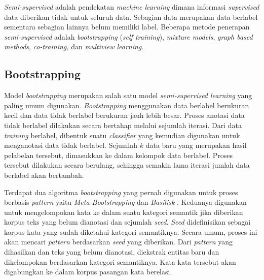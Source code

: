 \textit{Semi-supervised} adalah pendekatan \textit{machine learning} dimana informasi \textit{supervised} data diberikan tidak untuk seluruh data. Sebagian data merupakan data berlabel sementara sebagian lainnya belum memiliki label. Beberapa metode penerapan \textit{semi-supervised} adalah \textit{bootstrapping} (\textit{self training}), \textit{mixture models}, \textit{graph based methods}, \textit{co-training,} dan \textit{multiview learning}.

\subsection{Bootstrapping}
Model \textit{bootstrapping} merupakan salah satu model \textit{semi-supervised learning} yang paling umum digunakan. \textit{Bootstrapping} menggunakan data berlabel berukuran kecil dan data tidak berlabel berukuran jauh lebih besar. Proses anotasi data tidak berlabel dilakukan secara bertahap melalui sejumlah iterasi. Dari data \textit{training} berlabel, dibentuk suatu \textit{classifier} yang kemudian digunakan untuk menganotasi data tidak berlabel. Sejumlah $k$ data baru yang merupakan hasil pelabelan tersebut, dimasukkan ke dalam kelompok data berlabel. Proses tersebut dilakukan secara berulang, sehingga semakin lama iterasi jumlah data berlabel akan bertambah. 

Terdapat dua algoritma \textit{bootstrapping} yang pernah digunakan untuk proses berbasis \textit{pattern} yaitu \textit{Meta-Bootstrapping} dan \textit{Basilisk} \citep{riloff2003learning}. Keduanya digunakan untuk mengelompokan kata ke dalam suatu kategori semantik jika diberikan korpus teks yang belum dianotasi dan sejumlah \textit{seed}. \textit{Seed} didefinisikan sebagai korpus kata yang sudah diketahui kategori semantiknya. Secara umum, proses ini akan mencari \textit{pattern} berdasarkan \textit{seed} yang diberikan. Dari \textit{pattern} yang dihasilkan dan teks yang belum dianotasi, diekstrak entitas baru dan dikelompokan berdasarkan kategori semantiknya. Kata-kata tersebut akan digabungkan ke dalam korpus pasangan kata berelasi.


